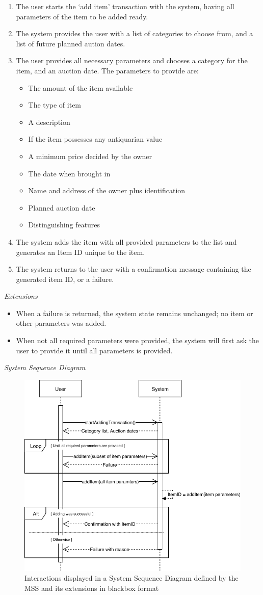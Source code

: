\begin{enumerate}[noitemsep]
	\item The user starts the `add item' transaction with the system, having all parameters of the item to be added ready.
	\item The system provides the user with a list of categories to choose from, and a list of future planned aution dates.
	\item The user provides all necessary parameters and chooses a category for the item, and an auction date. The parameters to provide are:
	\begin{itemize}[noitemsep]
		\item The amount of the item available
		\item The type of item
		\item A description
		\item If the item possesses any antiquarian value
		\item A minimum price decided by the owner
		\item The date when brought in
		\item Name and address of the owner plus identification
		\item Planned auction date
		\item Distinguishing features
	\end{itemize}
	\item The system adds the item with all provided parameters to the list and generates an Item ID unique to the item.
	\item The system returns to the user with a confirmation message containing the generated item ID, or a failure.
\end{enumerate}
\textsl{Extensions}
\begin{itemize}[noitemsep]
	\item When a failure is returned, the system state remains unchanged; no item or other parameters was added.
	\item When not all required parameters were provided, the system will first ask the user to provide it until all parameters is provided.
\end{itemize}
\textsl{System Sequence Diagram}
\begin{figure}[H]
	\centering
	\includegraphics[scale=1]{SD-bb-create.pdf}
	\caption*{Interactions displayed in a System Sequence Diagram defined by the MSS and its extensions in blackbox format}
\end{figure}
